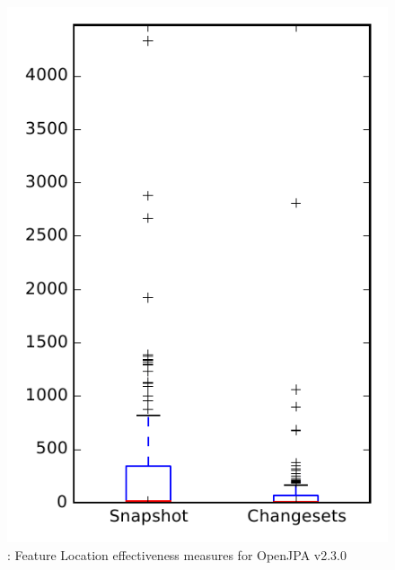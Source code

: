 
\begin{figure}
\centering
\includegraphics[height=0.4\textheight]{figures/flt/rq1_openjpa}
\caption{\fone: Feature Location effectiveness measures for OpenJPA v2.3.0}
\label{fig:flt:rq1:openjpa}
\end{figure}
